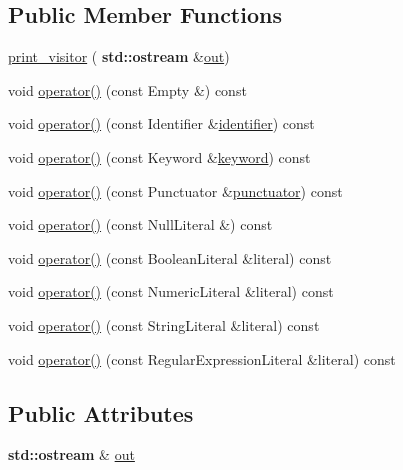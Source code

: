\subsection*{Public Member Functions}
\begin{DoxyCompactItemize}
\item 
\hyperlink{struct_token_1_1print__visitor_ae7203227ece074fd22543fd99e81dfc4}{print\+\_\+visitor} (\textbf{ std\+::ostream} \&\hyperlink{struct_token_1_1print__visitor_a9b32ad27a09d9c03df39a1b11bb6d638}{out})
\item 
void \hyperlink{struct_token_1_1print__visitor_aea3ede94932e7bc862d225768a289b22}{operator()} (const Empty \&) const
\item 
void \hyperlink{struct_token_1_1print__visitor_aa552b084f27de8bfeb5683bbd7e22965}{operator()} (const Identifier \&\hyperlink{class_token_a15dc839f68c100e6041c7ca089ea9005}{identifier}) const
\item 
void \hyperlink{struct_token_1_1print__visitor_a36d0662b3d8a3ae257a318d71a96e5ba}{operator()} (const Keyword \&\hyperlink{class_token_a8c0612a3b0a9b6eb05dfd9e75aafcb33}{keyword}) const
\item 
void \hyperlink{struct_token_1_1print__visitor_af16c79081b866ab87dda15bbc1a49edf}{operator()} (const Punctuator \&\hyperlink{class_token_aef1c084308395ed9ad7328a6aa321e5a}{punctuator}) const
\item 
void \hyperlink{struct_token_1_1print__visitor_a402d1a387fdaa8c5b443718c6cd0697c}{operator()} (const Null\+Literal \&) const
\item 
void \hyperlink{struct_token_1_1print__visitor_ab88df6a9d1f1a1d80dc08d5f65ab3cbb}{operator()} (const Boolean\+Literal \&literal) const
\item 
void \hyperlink{struct_token_1_1print__visitor_a2f78dce7fa82bde5d398665bd4937d52}{operator()} (const Numeric\+Literal \&literal) const
\item 
void \hyperlink{struct_token_1_1print__visitor_a495929c1887c05a00f116c19107dab75}{operator()} (const String\+Literal \&literal) const
\item 
void \hyperlink{struct_token_1_1print__visitor_a7507bdda946c495193de27afd742572f}{operator()} (const Regular\+Expression\+Literal \&literal) const
\end{DoxyCompactItemize}
\subsection*{Public Attributes}
\begin{DoxyCompactItemize}
\item 
\textbf{ std\+::ostream} \& \hyperlink{struct_token_1_1print__visitor_a9b32ad27a09d9c03df39a1b11bb6d638}{out}
\end{DoxyCompactItemize}


